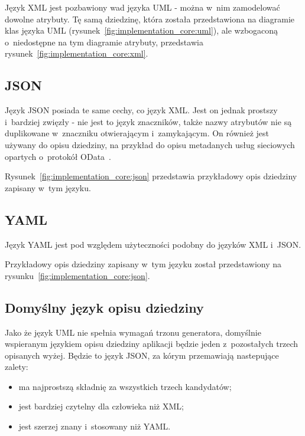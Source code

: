 Język XML jest pozbawiony wad języka UML - można w~nim zamodelować dowolne atrybuty.
Tę samą dziedzinę, która została przedstawiona na diagramie klas języka UML (rysunek~\ref{fig:implementation_core:uml}), ale wzbogaconą o~niedostępne na tym diagramie atrybuty, przedstawia rysunek~\ref{fig:implementation_core:xml}.




\subsection{JSON}

Język JSON posiada te same cechy, co język XML.
Jest on jednak prostszy i~bardziej zwięzły - nie jest to język znaczników, także nazwy atrybutów nie są duplikowane w~znaczniku otwierającym i~zamykającym.
On również jest używany do opisu dziedziny, na przykład do opisu metadanych usług sieciowych opartych o~protokół OData~\cite{odata}.

Rysunek~\ref{fig:implementation_core:json} przedstawia przykładowy opis dziedziny zapisany w~tym języku.




\subsection{YAML}

Język YAML jest pod względem użyteczności podobny do języków XML i~JSON.


Przykładowy opis dziedziny zapisany w~tym języku został przedstawiony na rysunku~\ref{fig:implementation_core:json}.




\subsection{Domyślny język opisu dziedziny}

Jako że język UML nie spełnia wymagań trzonu generatora, domyślnie wspieranym językiem opisu dziedziny aplikacji będzie jeden z~pozostałych trzech opisanych wyżej.
Będzie to język JSON, za kórym przemawiają nastepujące zalety:

\begin{itemize}
 \item ma najprostszą składnię za wszystkich trzech kandydatów;
 \item jest bardziej czytelny dla człowieka niż XML;
 \item jest szerzej znany i~stosowany niż YAML.
\end{itemize}

